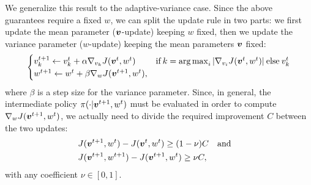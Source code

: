 We generalize this result to the adaptive-variance case. Since the above guarantees require a fixed $w$, we can split the update rule in two parts: we first update the mean parameter ($\vv$-update) keeping $w$ fixed, then we update the variance parameter ($w$-update) keeping the mean parameters $\vv$ fixed:
%
\begin{align}\label{eq:naive_update}
\begin{cases}
v_{k}^{t+1} \gets v_{k}^t + \alpha\gradJ[v_{k}]{\vv^t,w^t}
	& \text{if}\:k =  \argmax_i |\gradJ[v_i]{\vv^t, w^t}| \:\text{else}\:v_{k}^t\\
w^{t+1} \gets w^t + \beta\gradJ[w]{\vv^{t+1}, w^t},
\end{cases}
\end{align}
%
where $\beta$ is a step size for the variance parameter.
Since, in general, the intermediate policy $\pi(\cdot\vert\vv^{t+1},w^t)$ must be evaluated in order to compute $\gradJ[w]{\vv^{t+1},w^t}$, we actually need to divide the required improvement $C$ between the two updates:
%
\begin{align}%
&J(\vv^{t+1},w^t) - J(\vv^t,w^t) \geq (1-\nu) C \quad \text{and}\quad \label{eq:update-first} \\ 
&J(\vv^{t+1},w^{t+1}) - J(\vv^{t+1},w^t) \geq \nu C, \label{eq:update-second}
\end{align}
with any coefficient $\nu \in [0,1]$.


